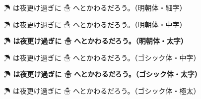 \documentclass{ltjsarticle}
\begin{document}
{\mcfamily\ltseries ☂ は夜更け過ぎに ☃ へとかわるだろう。（明朝体・細字）}\par
{\mcfamily          ☂ は夜更け過ぎに ☃ へとかわるだろう。（明朝体・中字）}\par
{\mcfamily\bfseries ☂ は夜更け過ぎに ☃ へとかわるだろう。（明朝体・太字）}\par

{\gtfamily          ☂ は夜更け過ぎに ☃ へとかわるだろう。（ゴシック体・中字）}\par
{\gtfamily\bfseries ☂ は夜更け過ぎに ☃ へとかわるだろう。（ゴシック体・太字）}\par
{\gtfamily\ebseries ☂ は夜更け過ぎに ☃ へとかわるだろう。（ゴシック体・極太）}
\end{document}
